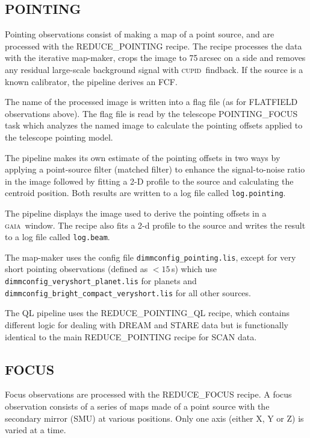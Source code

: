 \documentclass[twoside,11pt,nolof]{starlink}
\providecommand{\CUPID}{\textsc{cupid}}
\providecommand{\GAIA}{\textsc{gaia}}
\providecommand{\task}[1]{\textsf{#1}}
\begin{document}
\subsection{POINTING}

Pointing observations consist of making a map of a point source, and
are processed with the \task{REDUCE\_POINTING} recipe. The recipe
processes the data with the iterative map-maker, crops the image to
75\,arcsec on a side and removes any residual large-scale background
signal with \CUPID\ \task{findback}. If the source is a known
calibrator, the pipeline derives an FCF.

The name of the processed image is written into a flag file (as for
FLATFIELD observations above). The flag file is read by the telescope
POINTING\_FOCUS task which analyzes the named image to calculate the
pointing offsets applied to the telescope pointing model.

The pipeline makes its own estimate of the pointing offsets in two
ways by applying a point-source filter (matched filter) to enhance the
signal-to-noise ratio in the image followed by fitting a 2-D profile
to the source and calculating the centroid position. Both results are
written to a log file called \verb+log.pointing+.

The pipeline displays the image used to derive the pointing offsets in
a \GAIA\ window. The recipe also fits a 2-d profile to the source and
writes the result to a log file called \verb+log.beam+.

The map-maker uses the config file \verb+dimmconfig_pointing.lis+,
except for very short pointing observations (defined as $<15$\,s)
which use \verb+dimmconfig_veryshort_planet.lis+ for planets and
\verb+dimmconfig_bright_compact_veryshort.lis+ for all other sources.

The QL pipeline uses the \task{REDUCE\_POINTING\_QL} recipe, which
contains different logic for dealing with DREAM and STARE data but is
functionally identical to the main \task{REDUCE\_POINTING} recipe for
SCAN data.

\subsection{FOCUS}

Focus observations are processed with the \task{REDUCE\_FOCUS}
recipe. A focus observation consists of a series of maps made of a
point source with the secondary mirror (SMU) at various
positions. Only one axis (either X, Y or Z) is varied at a time.
\end{document}
